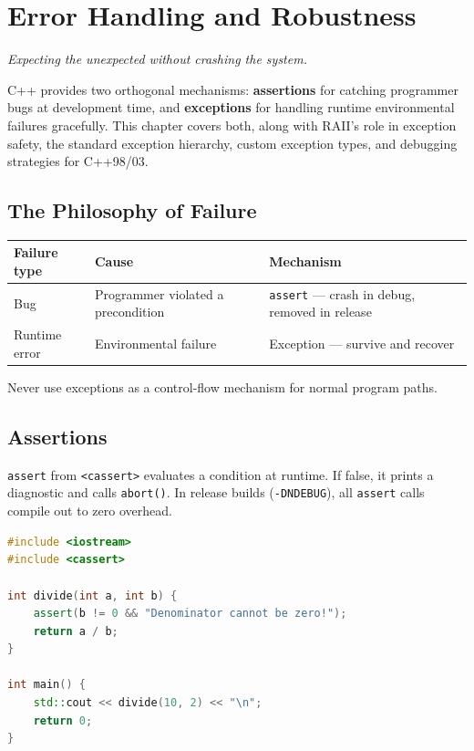 \chapter{Error Handling and Robustness}
\label{ch:error-handling}

\textit{Expecting the unexpected without crashing the system.}

C++ provides two orthogonal mechanisms: \textbf{assertions} for catching programmer bugs at development time, and \textbf{exceptions} for handling runtime environmental failures gracefully. This chapter covers both, along with RAII's role in exception safety, the standard exception hierarchy, custom exception types, and debugging strategies for C++98/03.

\section{The Philosophy of Failure}
\label{sec:philosophy-failure}

\begin{center}
\begin{tabular}{|l|l|l|}
\hline
\textbf{Failure type} & \textbf{Cause} & \textbf{Mechanism} \\
\hline
Bug               & Programmer violated a precondition & \texttt{assert} — crash in debug, removed in release \\
Runtime error     & Environmental failure               & Exception — survive and recover \\
\hline
\end{tabular}
\end{center}

Never use exceptions as a control-flow mechanism for normal program paths.

\section{Assertions}
\label{sec:assertions}

\texttt{assert} from \texttt{<cassert>} evaluates a condition at runtime. If false, it prints a diagnostic and calls \texttt{abort()}. In release builds (\texttt{-DNDEBUG}), all \texttt{assert} calls compile out to zero overhead.

\begin{lstlisting}[language=C++, caption={Using assert to enforce preconditions}]
#include <iostream>
#include <cassert>

int divide(int a, int b) {
    assert(b != 0 && "Denominator cannot be zero!");
    return a / b;
}

int main() {
    std::cout << divide(10, 2) << "\n";
    return 0;
}
\end{lstlisting}


